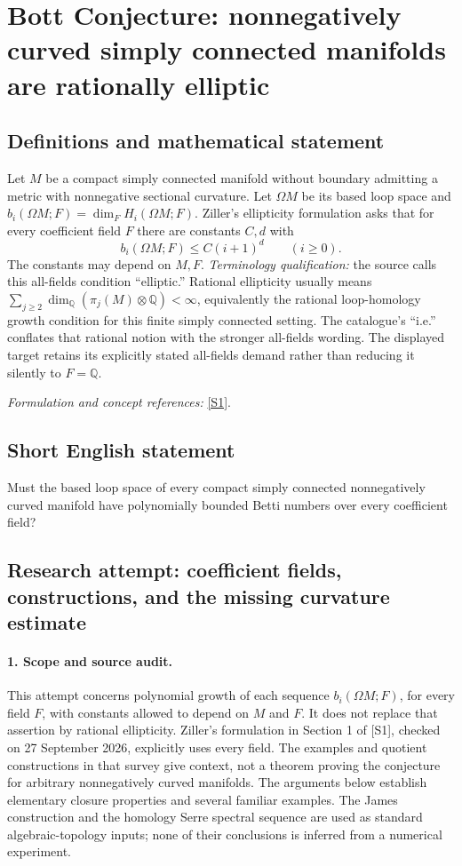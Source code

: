 \documentclass[11pt]{article}
\begin{document}
\section*{\texorpdfstring{Bott Conjecture: nonnegatively curved simply connected manifolds are rationally elliptic}{Bott Conjecture: nonnegatively curved simply connected manifolds are rationally elliptic}}\label{30006875}
\subsection{Definitions and mathematical statement}
Let $M$ be a compact simply connected manifold without boundary admitting a metric with nonnegative sectional curvature. Let $\Omega M$ be its based loop space and $b_i(\Omega M;F)=\dim_F H_i(\Omega M;F)$. Ziller's ellipticity formulation asks that for every coefficient field $F$ there are constants $C,d$ with
\[
 b_i(\Omega M;F)\le C(i+1)^d\qquad(i\ge0).
\]
The constants may depend on $M,F$. \emph{Terminology qualification:} the source calls this all-fields condition ``elliptic.'' Rational ellipticity usually means $\sum_{j\ge2}\dim_{{\mathbb{Q}}}(\pi_j(M)\otimes{\mathbb{Q}})<\infty$, equivalently the rational loop-homology growth condition for this finite simply connected setting. The catalogue's ``i.e.'' conflates that rational notion with the stronger all-fields wording. The displayed target retains its explicitly stated all-fields demand rather than reducing it silently to $F={\mathbb{Q}}$.
\par\smallskip\textit{Formulation and concept references:} \href{https://arxiv.org/html/math/0701389v3}{[S1]}.

\subsection{Short English statement}
Must the based loop space of every compact simply connected nonnegatively curved manifold have polynomially bounded Betti numbers over every coefficient field?
\subsection{Research attempt: coefficient fields, constructions, and the missing curvature estimate}
\paragraph{1. Scope and source audit.}
This attempt concerns polynomial growth of each sequence $b_i(\Omega M;F)$, for every field $F$, with constants allowed to depend on $M$ and $F$. It does not replace that assertion by rational ellipticity. Ziller's formulation in Section 1 of [S1], checked on 27 September 2026, explicitly uses every field. The examples and quotient constructions in that survey give context, not a theorem proving the conjecture for arbitrary nonnegatively curved manifolds. The arguments below establish elementary closure properties and several familiar examples. The James construction and the homology Serre spectral sequence are used as standard algebraic-topology inputs; none of their conclusions is inferred from a numerical experiment.
\end{document}
